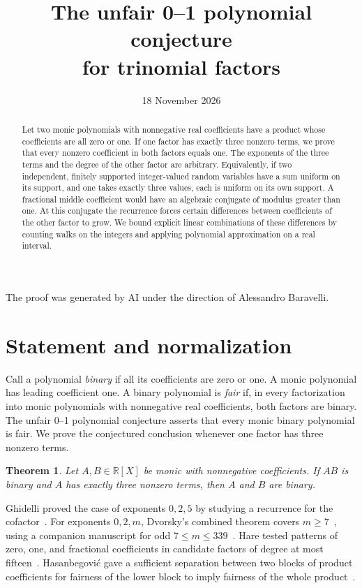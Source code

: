 \documentclass[11pt,reqno]{amsart}
\title[The unfair 0--1 conjecture for trinomial factors]{The unfair 0--1 polynomial conjecture\\ for trinomial factors}
\date{18 November 2026}
\numberwithin{equation}{section}
\newtheorem{theorem}{Theorem}[section]
\begin{document}
\begin{abstract}
Let two monic polynomials with nonnegative real coefficients have a product whose coefficients are all zero or one. If one factor has exactly three nonzero terms, we prove that every nonzero coefficient in both factors equals one. The exponents of the three terms and the degree of the other factor are arbitrary. Equivalently, if two independent, finitely supported integer-valued random variables have a sum uniform on its support, and one takes exactly three values, each is uniform on its own support. A fractional middle coefficient would have an algebraic conjugate of modulus greater than one. At this conjugate the recurrence forces certain differences between coefficients of the other factor to grow. We bound explicit linear combinations of these differences by counting walks on the integers and applying polynomial approximation on a real interval.
\end{abstract}
\maketitle

\begin{center}
\small The proof was generated by AI under the direction of Alessandro Baravelli.
\end{center}

\section{Statement and normalization}
Call a polynomial \emph{binary} if all its coefficients are zero or one. A monic polynomial has leading coefficient one. A binary polynomial is \emph{fair} if, in every factorization into monic polynomials with nonnegative real coefficients, both factors are binary. The unfair 0--1 polynomial conjecture asserts that every monic binary polynomial is fair. We prove the conjectured conclusion whenever one factor has three nonzero terms.
\begin{theorem}\label{thm:main}
Let $A,B\in\mathbb R[X]$ be monic with nonnegative coefficients. If $AB$ is binary and $A$ has exactly three nonzero terms, then $A$ and $B$ are binary.
\end{theorem}
Ghidelli proved the case of exponents $0,2,5$ by studying a recurrence for the cofactor~\cite{ghidelli}. For exponents $0,2,m$, Dvorsky's combined theorem covers $m\ge7$~\cite[Theorem~1.1]{dvorsky}, using a companion manuscript for odd $7\le m\le339$~\cite{dvorsky-finite}. Hare tested patterns of zero, one, and fractional coefficients in candidate factors of degree at most fifteen~\cite{hare}. Hasanbegovi\'c gave a sufficient separation between two blocks of product coefficients for fairness of the lower block to imply fairness of the whole product~\cite{hasanbegovic}.
\end{document}
